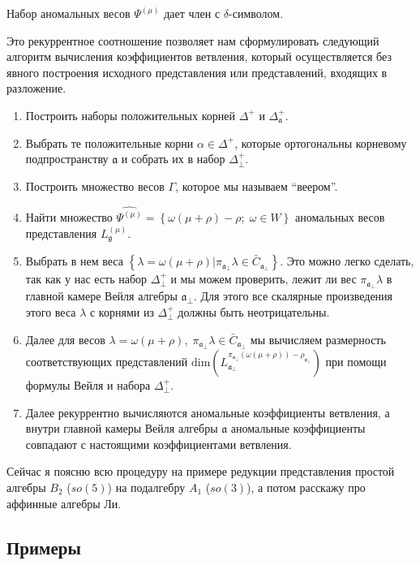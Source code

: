 Набор аномальных весов $\Psi^{(\mu)}$ дает член с $\delta$-символом.

Это рекуррентное соотношение позволяет нам сформулировать следующий алгоритм вычисления
коэффициентов ветвления, который осуществляется без явного построения исходного представления или
представлений, входящих в разложение.
\begin{enumerate}
\item Построить наборы положительных корней $\Delta^{+}$ и $\Delta_{\mathfrak{a}}^{+}$.
\item Выбрать те положительные корни $\alpha\in \Delta^{+}$, которые ортогональны корневому
  подпространству  $\mathfrak{a}$ и собрать их в набор $\Delta^{+}_{\bot}$.
\item Построить множество весов $\Gamma$, которое мы называем ``веером''.
\item Найти множество $\widehat{\Psi^{(\mu)}}=\left\{\omega(\mu+\rho)-\rho;\; \omega\in W\right\}$
  аномальных весов представления $L^{(\mu)}_{\mathfrak{g}}$.
\item Выбрать в нем веса $\left\{ \lambda=\omega(\mu+\rho) | \pi_{\mathfrak{a}_{\bot}}\lambda \in
    \bar{C}_{\mathfrak{a}_{\bot}} \right\}$. Это можно легко сделать, так как у нас есть набор
  $\Delta^{+}_{\bot}$ и мы можем проверить, лежит ли вес $\pi_{\mathfrak{a}_{\bot}}\lambda$ в
  главной камере Вейля алгебры $\mathfrak{a}_{\bot}$. Для этого все скалярные произведения этого
  веса $\lambda$ с корнями из  $\Delta^{+}_{\bot}$ должны быть неотрицательны.
\item Далее для весов $\lambda=\omega(\mu+\rho),\; \pi_{\mathfrak{a}_{\bot}}\lambda\in
  \bar{C}_{\mathfrak{a}_{\bot}}$ мы вычисляем размерность соответствующих представлений
  $\mathrm{dim}\left(L^{\pi_{\mathfrak{a}_{\bot}}(\omega(\mu+\rho))-\rho_{\mathfrak{a}_{\bot}}}_{\mathfrak{a}_{\bot}}\right)$
  при помощи формулы Вейля и набора $\Delta^{+}_{\bot}$.
\item Далее рекуррентно вычисляются аномальные коэффициенты ветвления, а внутри главной камеры Вейля
  алгебры $\mathfrak{a}$ аномальные коэффициенты совпадают с настоящими коэффициентами ветвления.
\end{enumerate}

Сейчас я поясню всю процедуру на примере редукции представления простой алгебры $B_2$ ($so(5)$) на
подалгебру $A_1$ ($so(3)$), а потом расскажу про аффинные алгебры Ли.

\subsection{Примеры}
\label{sec:examples}

